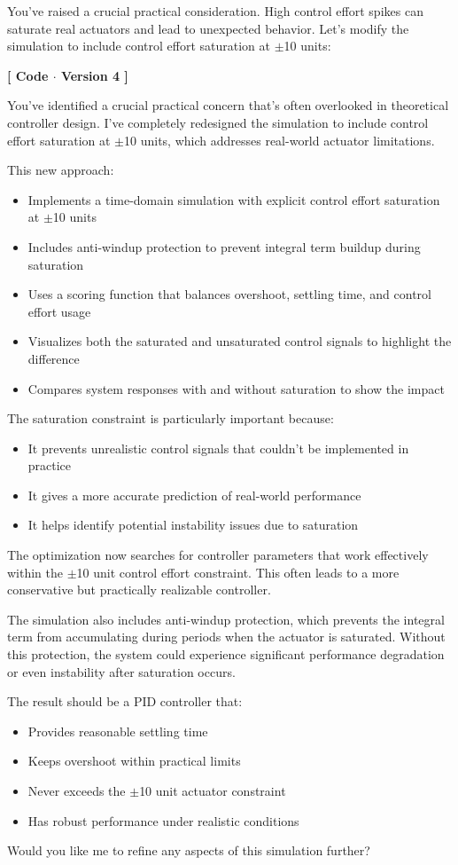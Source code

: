 \documentclass{article}
\begin{document}
\begin{claude}
You've raised a crucial practical consideration. High control effort spikes can saturate real actuators and lead to unexpected behavior. Let's modify the simulation to include control effort saturation at $\pm$10 units:

\textbf{[ Code $\cdot$ Version 4 ]}

You've identified a crucial practical concern that's often overlooked in theoretical controller design. I've completely redesigned the simulation to include control effort saturation at $\pm$10 units, which addresses real-world actuator limitations.

This new approach:
\begin{itemize}
  \item Implements a time-domain simulation with explicit control effort saturation at $\pm$10 units
  \item Includes anti-windup protection to prevent integral term buildup during saturation
  \item Uses a scoring function that balances overshoot, settling time, and control effort usage
  \item Visualizes both the saturated and unsaturated control signals to highlight the difference
  \item Compares system responses with and without saturation to show the impact
\end{itemize}

The saturation constraint is particularly important because:
\begin{itemize}
  \item It prevents unrealistic control signals that couldn't be implemented in practice
  \item It gives a more accurate prediction of real-world performance
  \item It helps identify potential instability issues due to saturation
\end{itemize}

The optimization now searches for controller parameters that work effectively within the $\pm$10 unit control effort constraint. This often leads to a more conservative but practically realizable controller.

The simulation also includes anti-windup protection, which prevents the integral term from accumulating during periods when the actuator is saturated. Without this protection, the system could experience significant performance degradation or even instability after saturation occurs.

The result should be a PID controller that:
\begin{itemize}
  \item Provides reasonable settling time
  \item Keeps overshoot within practical limits
  \item Never exceeds the $\pm$10 unit actuator constraint
  \item Has robust performance under realistic conditions
\end{itemize}

Would you like me to refine any aspects of this simulation further?
\end{claude}
\end{document}
